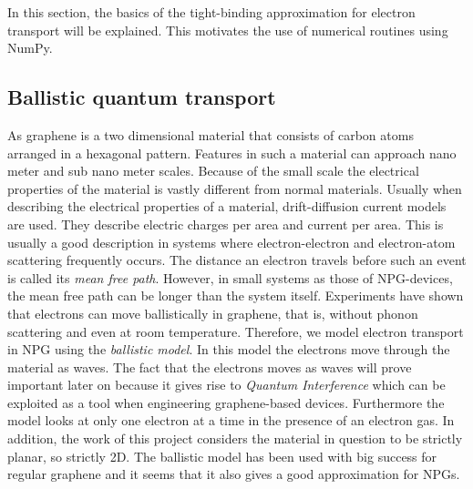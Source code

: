 In this section, the basics of the tight-binding approximation for electron transport will be explained. This motivates the use of numerical routines using NumPy.
\subsection{Ballistic quantum transport}
As graphene is a two dimensional material that consists of carbon atoms arranged in a hexagonal pattern. Features in such a material can approach nano meter and sub nano meter scales. Because of the small scale the electrical properties of the material is vastly different from normal materials. Usually when describing the electrical properties of a material, drift-diffusion current models are used. They describe electric charges per area and current per area. This is usually a good description in systems where electron-electron and electron-atom scattering frequently occurs. The distance an electron travels before such an event is called its \textit{mean free path}. However, in small systems as those of NPG-devices, the mean free path can be longer than the system itself. Experiments have shown that electrons can move ballistically in graphene\cite{banszerus_ballistic_2016,baringhaus_exceptional_2014,mayorov_micrometer-scale_2011}, that is, without phonon scattering and even at room temperature. Therefore, we model electron transport in NPG using the \textit{ballistic model}. In this model the electrons move through the material as waves. The fact that the electrons moves as waves will prove important later on because it gives rise to \textit{Quantum Interference} which can be exploited as a tool when engineering graphene-based devices\cite{markussen_relation_2010}. Furthermore the model looks at only one electron at a time in the presence of an electron gas. In addition, the work of this project considers the material in question to be strictly planar, so strictly 2D.  The ballistic model has been used with big success for regular graphene and it seems that it also gives a good approximation for NPGs.
